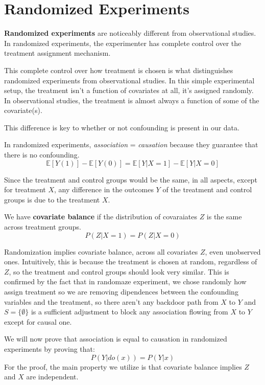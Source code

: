\chapter{Randomized Experiments}
\textbf{Randomized experiments} are noticeably different from observational studies.
In randomized experiments, the experimenter has complete control over the treatment
assignment mechanism.

This complete control over how treatment is chosen is what distinguishes randomized experiments from observational studies. In this simple experimental setup, the treatment
isn’t a function of covariates at all, it's assigned randomly. In observational studies, the treatment is almost always a function of some of the covariate(s).

This difference is key to whether or not confounding is present in our data.

In randomized experiments, \textit{association} = \textit{causation} because they guarantee that there is no confounding.
\begin{equation}
    \mathbb{E}[Y(1)] -  \mathbb{E}[Y(0)] = \mathbb{E}[Y| X = 1] - \mathbb{E}[Y | X = 0]
\end{equation}

Since the treatment and control groups would be the same, in all aspects, except for treatment $X$, any difference in the outcomes $Y$ of the treatment and control groups is due to the treatment $X$.
\begin{definition}
    We have \textbf{covariate balance} if the distribution of covaraiates $Z$ is the same across treatment groups.
    \begin{equation}
        P(Z|X = 1) = P(Z|X = 0)
    \end{equation}
\end{definition}

Randomization implies covariate balance, across all covariates $Z$, even unobserved ones. Intuitively, this is because the treatment is chosen at random, regardless of $Z$, so the treatment and control groups should look very similar.
This is confirmed by the fact that in randomaze experiment, we chose randomly how
assign treatment so we are removing dipendences between the confounding variables
and the treatment, so there aren't any backdoor path from $X$ to $Y$ and $S=\{\emptyset\}$
is a sufficient adjustment to block any association flowing from $X$ to $Y$ except for
causal one.

We will now prove that association is equal to causation in randomized experiments by proving that:
\begin{equation*}
    P(Y|do(x)) = P(Y|x)
\end{equation*}
For the proof, the main property we utilize is that covariate balance implies $Z$ and $X$ are independent.

